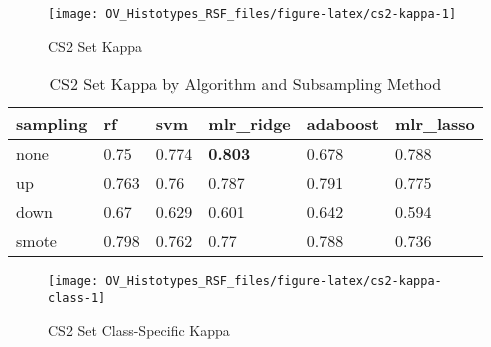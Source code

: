 \documentclass[
]{report}
\begin{document}
\begin{figure}[H]

{\centering \texttt{[image: OV\_Histotypes\_RSF\_files/figure-latex/cs2-kappa-1]} 

}

\caption{CS2 Set Kappa}\label{fig:cs2-kappa}
\end{figure}

\begin{table}

\caption{\label{tab:cs2-kappa-table}CS2 Set Kappa by Algorithm and Subsampling Method}
\centering
\begin{tabular}[t]{l|l|l|l|l|l}
\hline
sampling & rf & svm & mlr\_ridge & adaboost & mlr\_lasso\\
\hline
none & 0.75 & 0.774 & \textbf{0.803} & 0.678 & 0.788\\
\hline
up & 0.763 & 0.76 & 0.787 & 0.791 & 0.775\\
\hline
down & 0.67 & 0.629 & 0.601 & 0.642 & 0.594\\
\hline
smote & 0.798 & 0.762 & 0.77 & 0.788 & 0.736\\
\hline
\end{tabular}
\end{table}

\begin{figure}[H]

{\centering \texttt{[image: OV\_Histotypes\_RSF\_files/figure-latex/cs2-kappa-class-1]} 

}

\caption{CS2 Set Class-Specific Kappa}\label{fig:cs2-kappa-class}
\end{figure}
\end{document}
